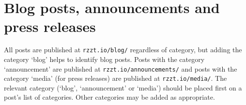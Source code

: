 \section{Blog posts, announcements and press releases}

All posts are published at \texttt{rzzt.io/blog/} regardless of category, but adding the category `blog' helps to identify blog posts. Posts with the category `announcement' are published at \texttt{rzzt.io/announcements/} and posts with the category `media' (for press releases) are published at \texttt{rzzt.io/media/}. The relevant category (`blog', `announcement' or `media') should be placed first on a post's list of categories. Other categories may be added as appropriate.
